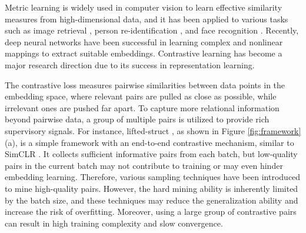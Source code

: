 \documentclass[10pt,twocolumn,letterpaper]{article}
\begin{document}
Metric learning is widely used in computer vision to learn effective similarity measures from high-dimensional data, and it has been applied to various tasks such as image retrieval \cite{benchmark, liftstruct,ce}, person re-identification \cite{circleloss,mgn}, and face recognition \cite{facenet,centerloss,cosface}. Recently, deep neural networks have been successful in learning complex and nonlinear mappings to extract suitable embeddings. Contrastive learning \cite{contrast,liftstruct,xbm} has become a major research direction due to its success in representation learning. 

\begin{figure*}[ht!]
\centering
{}\qquad
{}\qquad
{}
\caption{Conceptual comparison of difference contrastive mechanisms. (a) The encoder computes the query and contrasts it with one positive example and multiple, which is updated end-to-end \cite{simclr}. (b) The query data is contrasted with the embeddings sampled from a memory bank \cite{mb}, which is maintained as a queue with the mini-batches in the past iterations. (c) Our method maintains and updates a memory bank of category centers  by  in sync with the encoder, and contrasts them with the query data  by .
} 
\label{fig:framework}
\end{figure*}

The contrastive loss \cite{contrast} measures pairwise similarities between data points in the embedding space, where relevant pairs are pulled as close as possible, while irrelevant ones are pushed far apart. To capture more relational information beyond pairwise data, a group of multiple pairs \cite{facenet,npair,liftstruct,rll} is utilized to provide rich supervisory signals. For instance, lifted-struct \cite{liftstruct}, as shown in Figure \ref{fig:framework}(a), is a simple framework with an end-to-end contrastive mechanism, similar to SimCLR \cite{simclr}. It collects sufficient informative pairs from each batch, but low-quality pairs in the current batch may not contribute to training or may even hinder embedding learning. Therefore, various sampling techniques \cite{sct,strategy,fanng,sh,hdc} have been introduced to mine high-quality pairs. However, the hard mining ability is inherently limited by the batch size, and these techniques may reduce the generalization ability and increase the risk of overfitting. Moreover, using a large group of contrastive pairs can result in high training complexity and slow convergence.
\end{document}
